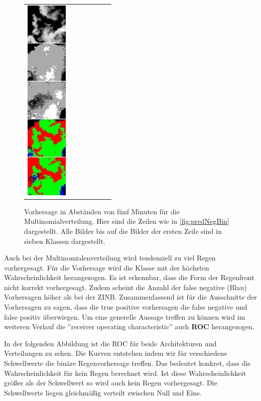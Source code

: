 \begin{figure}[h]
\begin{tabular}{lllllll}
\includegraphics[width=20mm]{abb/prediction/106_cat_maxCont}
\end{tabular}
\caption{Vorhersage in Abständen von fünf Minuten für die Multinomialverteilung. Hier sind die Zeilen wie in \ref{fig:predNegBin} dargestellt. Alle Bilder bis auf die Bilder der ersten Zeile sind in sieben Klassen dargestellt.\label{fig:predCat}}
\end{figure}


\noindent Auch bei der Multinomialenverteilung wird tendenziell zu viel Regen vorhergesagt. Für die Vorhersage wird die Klasse mit der höchsten Wahrscheinlichkeit herangezogen. Es ist erkennbar, dass die Form der Regenfront nicht korrekt vorhergesagt. Zudem scheint die Anzahl der false negative (Blau) Vorhersagen höher als bei der ZINB. Zusammenfassend ist für die Ausschnitte der Vorhersagen zu sagen, dass die true positive vorhersagen die false negative und false positiv überwiegen. Um eine generelle Aussage treffen zu können wird im weiteren Verlauf die ''receiver operating characteristic'' auch \textbf{ROC} herangezogen.
\newpage


\noindent In der folgenden Abbildung ist die ROC für beide Architekturen und Verteilungen zu sehen. Die Kurven entstehen indem wir für verschiedene Schwellwerte die binäre Regenvorhersage treffen. Das bedeutet konkret, dass die Wahrscheinlichkeit für kein Regen berechnet wird. Ist diese Wahrscheinlichkeit größer als der Schwellwert so wird auch kein Regen vorhergesagt.
Die Schwellwerte liegen gleichmäßig verteilt zwischen Null und Eins.


